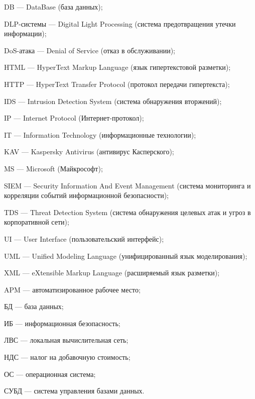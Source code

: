 \label{sec:reduction}
DB --- DataBase (база данных);

DLP-системы --- Digital Light Processing (система предотвращения утечки информации);

DoS-атака --- Denial of Service (отказ в обслуживании);

HTML --- HyperText Markup Language (язык гипертекстовой разметки);

HTTP --- HyperText Transfer Protocol (протокол передачи гипертекста);

IDS --- Intrusion Detection System (система обнаружения вторжений);

IP --- Internet Protocol (Интернет-протокол);

IT --- Information Technology (информационные технологии);

KAV --- Kaspersky Antivirus (антивирус Касперского);

MS --- Microsoft (Майкрософт);

SIEM --- Security Information And Event Management (система мониторинга и корреляции событий информационной безопасности);

TDS --- Threat Detection System (система обнаружения целевых атак и угроз в корпоративной сети);

UI --- User Interface (пользовательский интерфейс);

UML --- Unified Modeling Language (унифицированный язык моделирования);

XML --- eXtensible Markup Language (расширяемый язык разметки);

APM --- автоматизированное рабочее место;

БД --- база данных;

ИБ --- информационная безопасность;

ЛВС --- локальная вычислительная сеть;

НДС --- налог на добавочную стоимость;

ОС --- операционная система;

СУБД --- система управления базами данных.